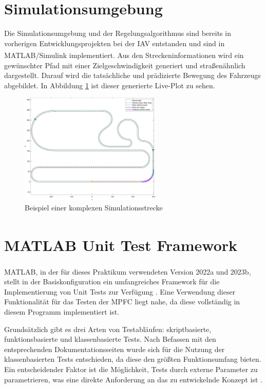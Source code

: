 \section{Simulationsumgebung} \label{sec:Simulationsumgebung}
Die Simulationsumgebung und der Regelungsalgorithmus sind bereits in vorherigen Entwicklungsprojekten bei der IAV entstanden und sind in MATLAB\textsuperscript{\textregistered}/Simulink implementiert. Aus den Streckeninformationen wird ein gewünschter Pfad mit einer Zielgeschwindigkeit generiert und straßenähnlich dargestellt. Darauf wird die tatsächliche und prädizierte Bewegung des Fahrzeugs abgebildet.  
In Abbildung \ref{fig:Simulation_Strecke} ist dieser generierte Live-Plot zu sehen.
\begin{figure}[ht]
    \centering
    \includegraphics[width=0.6\textwidth]{figures/3_Implementierung/simulationsumgebung.pdf}
    \caption{Beispiel einer komplexen Simulationsstrecke}
    \label{fig:Simulation_Strecke}
\end{figure}

\section{MATLAB\textsuperscript{\textregistered} Unit Test Framework} \label{sec:MatlabUnitTest}
MATLAB\textsuperscript{\textregistered}, in der für dieses Praktikum verwendeten Version 2022a und 2023b, stellt in der Basiskonfiguration ein umfangreiches Framework für die Implementierung von Unit Tests zur Verfügung \cite{matlabTest}. Eine Verwendung dieser Funktionalität für das Testen der MPFC liegt nahe, da diese vollständig in diesem Programm implementiert ist.

Grundsätzlich gibt es drei Arten von Testabläufen: skriptbasierte, funktionsbasierte und klassenbasierte Tests. Nach Befassen mit den entsprechenden Dokumentationsseiten wurde sich für die Nutzung der klassenbasierten Tests entschieden, da diese den größten Funktionsumfang bieten. Ein entscheidender Faktor ist die Möglichkeit, Tests durch externe Parameter zu parametrieren, was eine direkte Anforderung an das zu entwickelnde Konzept ist \cite{matlabTest}.

